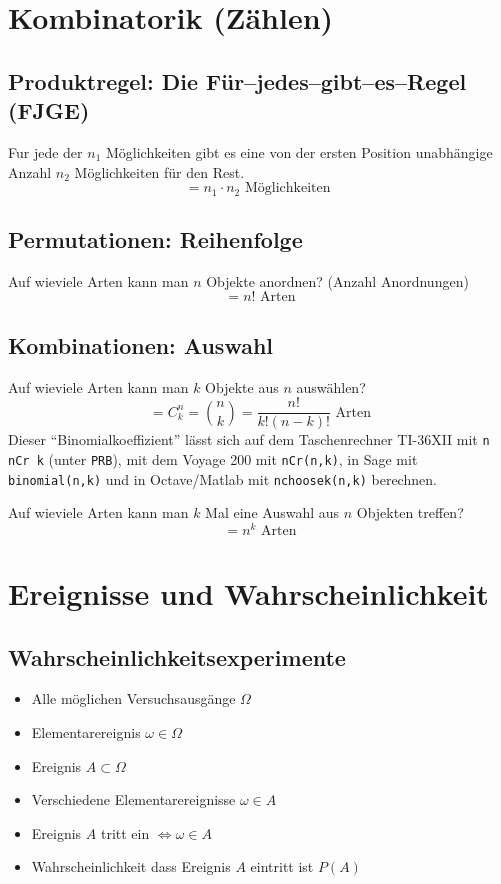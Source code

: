 \section{Kombinatorik (Zählen)}
\subsection{Produktregel: Die Für–jedes–gibt–es–Regel (FJGE)}
Fur jede der $n_1$ Möglichkeiten gibt es eine von der
ersten Position unabhängige Anzahl $n_2$ Möglichkeiten für den Rest.
\[ = n_1 \cdot n_2 \text{ Möglichkeiten } \]

\subsection{Permutationen: Reihenfolge}
Auf wieviele Arten kann man $n$ Objekte anordnen? (Anzahl Anordnungen)
\[ = n! \text{ Arten} \]

\subsection{Kombinationen: Auswahl}
Auf wieviele Arten kann man $k$ Objekte aus $n$ auswählen?
\[ = C^n_k=\binom{n}{k} = \frac{n!}{k!(n-k)!} \text{ Arten} \]
Dieser "`Binomialkoeffizient"' lässt sich auf dem Taschenrechner
TI-36XII mit \texttt{n nCr k} (unter \texttt{PRB}), mit dem Voyage 200
mit \texttt{nCr(n,k)}, in Sage mit \texttt{binomial(n,k)} und in 
Octave/Matlab mit \texttt{nchoosek(n,k)} berechnen.

Auf wieviele Arten kann man $k$ Mal eine Auswahl aus $n$ Objekten
treffen?
\[ = n^k \text{ Arten} \]

\section{Ereignisse und Wahrscheinlichkeit}
\subsection{Wahrscheinlichkeitsexperimente}
\begin{itemize}
  \item Alle möglichen Versuchsausgänge $\Omega$
  \item Elementarereignis $\omega \in \Omega$
  \item Ereignis $A \subset \Omega$
  \item Verschiedene Elementarereignisse $\omega \in A$
  \item Ereignis $A$ tritt ein $\Leftrightarrow \omega \in A$
  \item Wahrscheinlichkeit dass Ereignis $A$ eintritt ist $P(A)$
\end{itemize}

